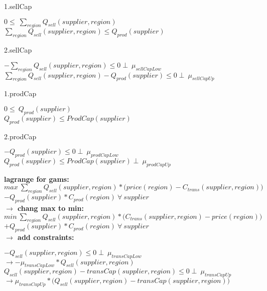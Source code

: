 \documentclass{article}
\begin{document}
1.sellCap
\begin{center}
	\(0 \leq\ \sum_{region} Q_{sell}(supplier, region) \)\\
	\(\sum_{region} Q_{sell}(supplier, region) \leq Q_{prod}(supplier)\)\\
\end{center}
2.sellCap
\begin{center}
	\( - \sum_{region} Q_{sell}(supplier, region)  \leq 0  \perp\: \mu_{sellCapLow}\)\\
	\(\sum_{region} Q_{sell}(supplier, region) -  Q_{prod}(supplier)\leq 0 \perp\: \mu_{sellCapUp} \)\\
\end{center}

1.prodCap
\begin{center}
	\(0 \leq\ Q_{prod}(supplier) \)\\  
	\(Q_{prod}(supplier) \leq ProdCap(supplier)\)\\
\end{center}
2.prodCap
\begin{center}
	\( - Q_{prod}(supplier) \leq 0 \perp\: \mu_{prodCapLow}\)\\
	\(Q_{prod}(supplier) \leq ProdCap(supplier)\perp\: \mu_{prodCapUp}\)\\
\end{center}


\textbf{lagrange for gams:}\\
\( max\:\sum_{region} Q_{sell}(supplier, region) *\Big(price(region) - C_{trans}(supplier,region)\Big) \)\\
\tab\tab\(- Q_{prod}(supplier)*C_{prod}(region)\:\forall\: supplier\) \\

\textbf{$\rightarrow$ chang max to min:}\\

\( min\:\sum_{region} Q_{sell}(supplier, region) *\Big(C_{trans}(supplier,region) - price(region)\Big) \)\\
\tab\tab\(+ Q_{prod}(supplier)*C_{prod}(region)\:\forall\: supplier\) \\

\textbf{$\rightarrow$ add constraints:}

	\(- Q_{sell}(supplier, region) \leq 0  \perp\: \mu_{transCapLow}\)\\
	$\rightarrow	- \mu_{transCapLow} * Q_{sell}(supplier, region)$\\
	\(Q_{sell}(supplier, region) - transCap(supplier, region) \leq 0  \perp\: \mu_{transCapUp}\)\\
	$\rightarrow\mu_{transCapUp} *\Big( Q_{sell}(supplier, region) - transCap(supplier, region)\Big)$\\
\end{document}
